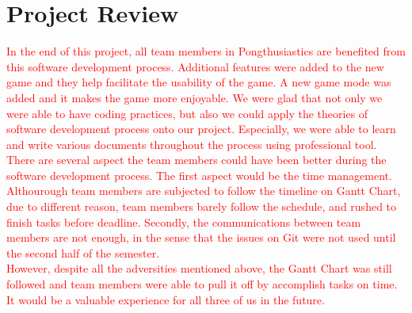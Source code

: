 \documentclass{article}
\begin{document}
\section {Project Review} 

\textcolor{red}{
In the end of this project, all team members in Pongthusiastics are benefited from this software development process. Additional features were added to the new game and they help facilitate the usability of the game. A new game mode was added and it makes the game more enjoyable. We were glad that not only we were able to have coding practices, but also we could apply the theories of software development process onto our project. Especially, we were able to learn and write various documents throughout the process using professional tool.} \\

\textcolor{red}{There are several aspect the team members could have been better during the software development process. The first aspect would be the time management. Althourough team members are subjected to follow the timeline on Gantt Chart, due to different reason, team members barely follow the schedule, and rushed to finish tasks before deadline. Secondly, the communications between team members are not enough, in the sense that the issues on Git were not used until the second half of the semester.}\\

\textcolor{red}{However, despite all the adversities mentioned above, the Gantt Chart was still followed and team members were able to pull it off by accomplish tasks on time. It would be a valuable experience for all three of us in the future.}\\
\end{document}
